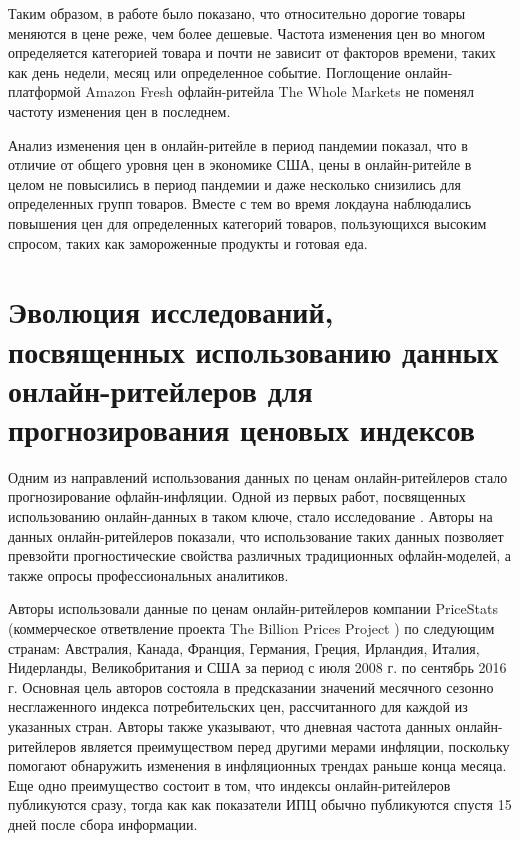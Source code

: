 Таким образом, в работе \cite{HILLEN202163} было показано, что относительно дорогие товары меняются в цене реже, чем более дешевые. Частота изменения цен во многом определяется категорией товара и почти не зависит от факторов времени, таких как день недели, месяц или определенное событие. Поглощение онлайн-платформой Amazon Fresh офлайн-ритейла The Whole Markets не поменял частоту изменения цен в последнем.

Анализ изменения цен в онлайн-ритейле в период пандемии \cite{hillen2021covid} показал, что в отличие от общего уровня цен в экономике США, цены в онлайн-ритейле в целом не повысились в период пандемии и даже несколько снизились для определенных групп товаров. Вместе с тем во время локдауна наблюдались повышения цен для определенных категорий товаров, пользующихся высоким спросом, таких как замороженные продукты и готовая еда. 




\section{Эволюция исследований, посвященных использованию данных онлайн-ритейлеров для прогнозирования ценовых индексов}\label{sec:ch1/sec2}

Одним из направлений использования данных по ценам онлайн-ритейлеров стало прогнозирование офлайн-инфляции. Одной из первых работ, посвященных использованию онлайн-данных в таком ключе, стало исследование \cite{aparicio2020forecasting}. Авторы на данных онлайн-ритейлеров показали, что использование таких данных позволяет превзойти прогностические свойства различных традиционных офлайн-моделей, а также опросы профессиональных аналитиков.

Авторы использовали данные по ценам онлайн-ритейлеров компании PriceStats (коммерческое ответвление проекта The Billion Prices Project \cite{cavallo2016billion}) по следующим странам: Австралия, Канада, Франция, Германия, Греция, Ирландия, Италия, Нидерланды, Великобритания и США за период с июля 2008 г. по сентябрь 2016 г. Основная цель авторов состояла в предсказании значений месячного сезонно несглаженного индекса потребительских цен, рассчитанного для каждой из указанных стран. Авторы также указывают, что дневная частота данных онлайн-ритейлеров является преимуществом перед другими мерами инфляции, поскольку помогают обнаружить изменения в инфляционных трендах раньше конца месяца. Еще одно преимущество состоит в том, что индексы онлайн-ритейлеров публикуются сразу, тогда как как показатели ИПЦ обычно публикуются спустя 15 дней после сбора информации.

